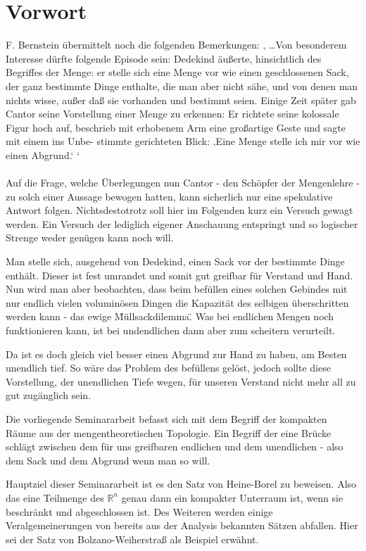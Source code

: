 \chapter{Vorwort}

F. Bernstein übermittelt noch die folgenden Bemerkungen:
‚ \dots Von besonderem Interesse dürfte folgende Episode sein: Dedekind äußerte, hinsichtlich 
des Begriffes der Menge: er stelle sich eine Menge vor wie einen geschlossenen
Sack, der ganz bestimmte Dinge enthalte, die man aber nicht sähe, und von denen man
nichts wisse, außer daß sie vorhanden und bestimmt seien. Einige Zeit später gab Cantor
seine Vorstellung einer Menge zu erkennen: Er richtete seine kolossale Figur hoch auf,
beschrieb mit erhobenem Arm eine großartige Geste und sagte mit einem ins Unbe-
stimmte gerichteten Blick: ‚Eine Menge stelle ich mir vor wie einen Abgrund.‘ ‘ 
\\
\\

Auf die Frage, welche Überlegungen nun Cantor - den Schöpfer der Mengenlehre - 
zu solch einer Aussage bewogen hatten, kann sicherlich nur eine spekulative Antwort folgen.
Nichtsdestotrotz soll hier im Folgenden kurz ein Versuch gewagt werden. Ein Versuch der lediglich
eigener Anschauung entspringt und so logischer Strenge weder genügen kann noch will.

Man stelle sich, ausgehend von Dedekind, einen Sack vor der bestimmte Dinge enthält.
Dieser ist fest umrandet und somit gut greifbar für Verstand und Hand. Nun wird man
aber beobachten, dass beim befüllen eines solchen Gebindes mit nur endlich vielen voluminösen Dingen 
die Kapazität des selbigen überschritten werden kann - das ewige \"Müllsackdilemma\".
Was bei endlichen Mengen noch funktionieren kann, ist bei undendlichen dann aber zum scheitern verurteilt.

Da ist es doch gleich viel besser einen Abgrund zur Hand zu haben, am Besten unendlich tief. So wäre
das Problem des befüllens gelöst, jedoch sollte diese Vorstellung, der unendlichen Tiefe wegen, für unseren
Verstand nicht mehr all zu gut zugänglich sein.

Die vorliegende Seminararbeit befasst sich mit dem Begriff der kompakten Räume aus der mengentheoretischen
Topologie. Ein Begriff der eine Brücke schlägt zwischen dem für uns greifbaren endlichen und dem
unendlichen - also dem Sack und dem Abgrund wenn man so will.

Hauptziel dieser Seminararbeit ist es den Satz von Heine-Borel zu beweisen. Also das eine Teilmenge des
\(\mathbb{R}^n\) genau dann ein kompakter Unterraum ist, wenn sie beschränkt und abgeschlossen ist.
Des Weiteren werden einige Veralgemeinerungen von bereits aus der Analysis bekannten Sätzen abfallen.
Hier sei der Satz von Bolzano-Weiherstraß als Beispiel erwähnt.

